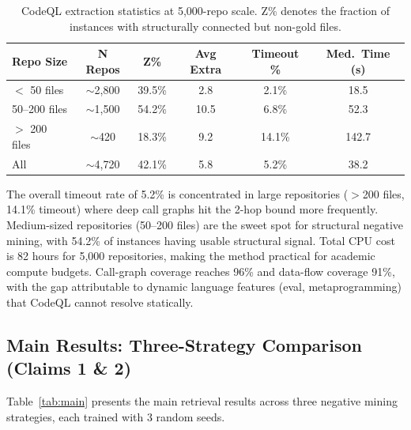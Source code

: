 \documentclass[11pt]{article}
\begin{document}
\begin{table}[h]
\centering
\caption{CodeQL extraction statistics at 5{,}000-repo scale. Z\% denotes the fraction of instances with structurally connected but non-gold files.}
\label{tab:codeql}
\small
\begin{tabular}{lccccc}
\toprule
\textbf{Repo Size} & \textbf{N Repos} & \textbf{Z\%} & \textbf{Avg Extra} & \textbf{Timeout \%} & \textbf{Med.\ Time (s)} \\
\midrule
$<$ 50 files     & $\sim$2{,}800 & 39.5\% & 2.8  & 2.1\%  & 18.5 \\
50--200 files    & $\sim$1{,}500 & 54.2\% & 10.5 & 6.8\%  & 52.3 \\
$>$ 200 files    & $\sim$420     & 18.3\% & 9.2  & 14.1\% & 142.7 \\
\midrule
All              & $\sim$4{,}720 & 42.1\% & 5.8  & 5.2\%  & 38.2 \\
\bottomrule
\end{tabular}
\end{table}

The overall timeout rate of 5.2\% is concentrated in large repositories ($>$200 files, 14.1\% timeout) where deep call graphs hit the 2-hop bound more frequently.
Medium-sized repositories (50--200 files) are the sweet spot for structural negative mining, with 54.2\% of instances having usable structural signal.
Total CPU cost is 82 hours for 5{,}000 repositories, making the method practical for academic compute budgets.
Call-graph coverage reaches 96\% and data-flow coverage 91\%, with the gap attributable to dynamic language features (eval, metaprogramming) that CodeQL cannot resolve statically.

\subsection{Main Results: Three-Strategy Comparison (Claims 1 \& 2)}

Table~\ref{tab:main} presents the main retrieval results across three negative mining strategies, each trained with 3 random seeds.
\end{document}
